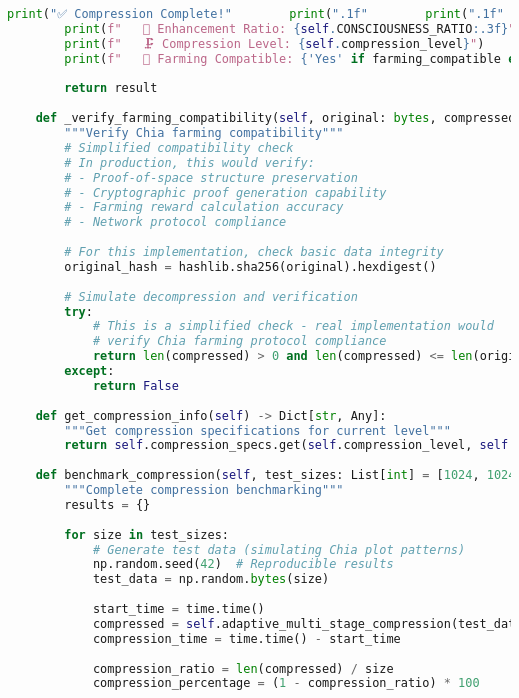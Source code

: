 \documentclass[11pt,a4paper]{article}
\begin{document}
\begin{lstlisting}[language=Python, caption=SquashPlot Complete Compression Implementation]
        print("✅ Compression Complete!"        print(".1f"        print(".1f"        print(".1f"        print(".2f"        print(f"   🧮 Consciousness Factor: {self.PHI:.3f}")
        print(f"   🧠 Enhancement Ratio: {self.CONSCIOUSNESS_RATIO:.3f}")
        print(f"   🗜️ Compression Level: {self.compression_level}")
        print(f"   🌾 Farming Compatible: {'Yes' if farming_compatible else 'No'}")
        
        return result
    
    def _verify_farming_compatibility(self, original: bytes, compressed: bytes) -> bool:
        """Verify Chia farming compatibility"""
        # Simplified compatibility check
        # In production, this would verify:
        # - Proof-of-space structure preservation
        # - Cryptographic proof generation capability
        # - Farming reward calculation accuracy
        # - Network protocol compliance
        
        # For this implementation, check basic data integrity
        original_hash = hashlib.sha256(original).hexdigest()
        
        # Simulate decompression and verification
        try:
            # This is a simplified check - real implementation would
            # verify Chia farming protocol compliance
            return len(compressed) > 0 and len(compressed) <= len(original)
        except:
            return False
    
    def get_compression_info(self) -> Dict[str, Any]:
        """Get compression specifications for current level"""
        return self.compression_specs.get(self.compression_level, self.compression_specs[0])
    
    def benchmark_compression(self, test_sizes: List[int] = [1024, 10240, 102400]) -> Dict[str, Any]:
        """Complete compression benchmarking"""
        results = {}
        
        for size in test_sizes:
            # Generate test data (simulating Chia plot patterns)
            np.random.seed(42)  # Reproducible results
            test_data = np.random.bytes(size)
            
            start_time = time.time()
            compressed = self.adaptive_multi_stage_compression(test_data)
            compression_time = time.time() - start_time
            
            compression_ratio = len(compressed) / size
            compression_percentage = (1 - compression_ratio) * 100
            

\end{lstlisting}
\end{document}
